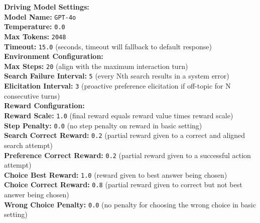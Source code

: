 {\small
\begin{tcolorbox}[colback=gray!5!white, colframe=black!75!black, 
title=Environment Configuration, boxrule=0.3mm, width=0.48\textwidth, arc=3mm, auto outer arc=true]

\textbf{Driving Model Settings:} \\
\hspace*{4mm}\textbf{Model Name:} \texttt{GPT-4o} \\
\hspace*{4mm}\textbf{Temperature:} \texttt{0.0} \\
\hspace*{4mm}\textbf{Max Tokens:} \texttt{2048} \\
\hspace*{4mm}\textbf{Timeout:} \texttt{15.0} (seconds, timeout will fallback to default response)\\

\textbf{Environment Configuration:} \\
\hspace*{4mm}\textbf{Max Steps:} \texttt{20} (align with the maximum interaction turn) \\
\hspace*{4mm}\textbf{Search Failure Interval:} \texttt{5} (every Nth search results in a system error) \\
\hspace*{4mm}\textbf{Elicitation Interval:} \texttt{3} (proactive preference elicitation if off-topic for N consecutive turns) \\

\textbf{Reward Configuration:} \\
\hspace*{4mm}\textbf{Reward Scale:} \texttt{1.0} (final reward equals reward value times reward scale) \\
\hspace*{4mm}\textbf{Step Penalty:} \texttt{0.0} (no step penalty on reward in basic setting) \\
\hspace*{4mm}\textbf{Search Correct Reward:} \texttt{0.2} (partial reward given to a correct and aligned search attempt) \\
\hspace*{4mm}\textbf{Preference Correct Reward:} \texttt{0.2} (partial reward given to a successful action attempt) \\
\hspace*{4mm}\textbf{Choice Best Reward:} \texttt{1.0} (reward given to best answer being chosen)\\
\hspace*{4mm}\textbf{Choice Correct Reward:} \texttt{0.8} (partial reward given to correct but not best answer being chosen) \\
\hspace*{4mm}\textbf{Wrong Choice Penalty:} \texttt{0.0} (no penalty for choosing the wrong choice in basic setting) \\


\end{tcolorbox}}
